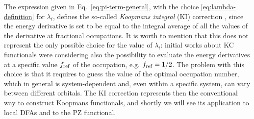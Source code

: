 The expression given in Eq.~\eqref{eq:pi-term-general}, with the choice \eqref{eq:lambda-definition} for $\lambda_i$, defines the so-called \emph{Koopmans integral} (KI) correction \cite{borghi_koopmans-compliant_2014}, since the energy derivative is set to be equal to the integral average of all the values of the derivative at fractional occupations. It is worth to mention that this does not represent the only possible choice for the value of $\lambda_i$: initial works about KC functionals \cite{dabo_non-koopmans_2009,dabo_koopmans_2010,borghi_koopmans-compliant_2014} were considering also the possibility to evaluate the energy derivatives at a specific value $f_{\rm ref}$ of the occupation, e.g. $f_{\rm ref}=1/2$. The problem with this choice is that it requires to guess the value of the optimal occupation number, which in general is system-dependent and, even within a specific system, can vary between different orbitals. The KI correction represents then the conventional way to construct Koopmans functionals, and shortly we will see its application to local DFAs and to the PZ functional.

